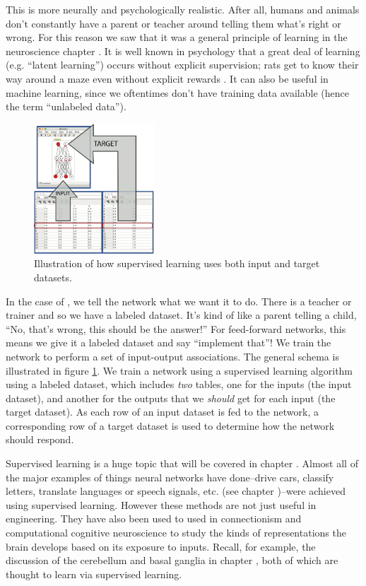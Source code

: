This is  more neurally and psychologically realistic. After all, humans and animals don't constantly have a parent or teacher around telling them what's right or wrong.  For this reason we saw that it was a general principle of learning in the neuroscience chapter . It is well known in psychology that a great deal of learning (e.g. ``latent learning'') occurs without explicit supervision; rats get to know their way around a maze even without explicit rewards \cite{wang2021latent}. It can also be useful in  machine learning, since we oftentimes don't have training data available (hence the term ``unlabeled data''). 

\begin{figure}[h]
\centering
\includegraphics[width=0.4\textwidth]{./images/dataset_supervised.png}
\caption[Simbrain screenshot with graphical elements added by Pamela Payne.]{Illustration of how supervised learning uses both input and target datasets.}
\label{supervised_learning}
\end{figure}

In the case of , we tell the network what we want it to do. There is a teacher or trainer and so we have a labeled dataset. It's kind of like a parent telling a child, ``No, that's wrong, this should be the answer!'' For feed-forward networks, this means we give it a labeled dataset and say ``implement that''! We train the network to perform a set of input-output associations. The general schema is illustrated in figure \ref{supervised_learning}. We train a network using a supervised learning algorithm using a labeled dataset, which includes \emph{two} tables, one for the inputs (the input dataset), and another for the outputs that we \emph{should} get for each input (the target dataset). As each row of an input dataset is  fed to the network, a corresponding row of a target dataset is used to determine how the network should respond. 

Supervised learning is a huge topic that will be covered in chapter . Almost all of the major examples of things neural networks have done--drive cars, classify letters, translate languages or speech signals, etc. (see chapter )--were achieved using supervised learning. However these methods are not just useful in engineering. They have also been used to used in connectionism and computational cognitive neuroscience to study the kinds  of representations the brain develops based on its exposure to inputs. Recall, for example, the discussion of the cerebellum and basal ganglia in chapter , both of which are thought to learn via supervised learning.

